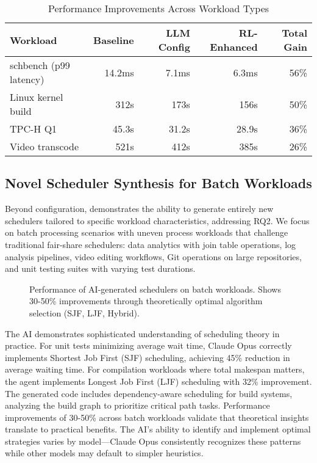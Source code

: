 \begin{table}[h]
\caption{Performance Improvements Across Workload Types}
\label{tab:performance-results}
\begin{tabular}{lrrrr}
\toprule
Workload & Baseline & LLM Config & RL-Enhanced & Total Gain \\
\midrule
schbench (p99 latency) & 14.2ms & 7.1ms & 6.3ms & 56\% \\
Linux kernel build & 312s & 173s & 156s & 50\% \\
TPC-H Q1 & 45.3s & 31.2s & 28.9s & 36\% \\
Video transcode & 521s & 412s & 385s & 26\% \\
\bottomrule
\end{tabular}
\end{table}

\subsection{Novel Scheduler Synthesis for Batch Workloads}

Beyond configuration, \sys demonstrates the ability to generate entirely new schedulers tailored to specific workload characteristics, addressing RQ2. We focus on batch processing scenarios with uneven process workloads that challenge traditional fair-share schedulers: data analytics with join table operations, log analysis pipelines, video editing workflows, Git operations on large repositories, and unit testing suites with varying test durations.

\begin{figure}[h]
\centering
{}
\caption{Performance of AI-generated schedulers on batch workloads. Shows 30-50\% improvements through theoretically optimal algorithm selection (SJF, LJF, Hybrid).}
\label{fig:batch-performance}
\end{figure}

The AI demonstrates sophisticated understanding of scheduling theory in practice. For unit tests minimizing average wait time, Claude Opus correctly implements Shortest Job First (SJF) scheduling, achieving 45\% reduction in average waiting time. For compilation workloads where total makespan matters, the agent implements Longest Job First (LJF) scheduling with 32\% improvement. The generated code includes dependency-aware scheduling for build systems, analyzing the build graph to prioritize critical path tasks. Performance improvements of 30-50\% across batch workloads validate that theoretical insights translate to practical benefits. The AI's ability to identify and implement optimal strategies varies by model—Claude Opus consistently recognizes these patterns while other models may default to simpler heuristics.

